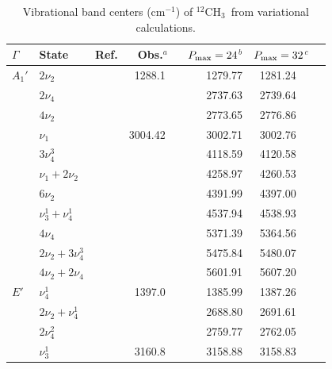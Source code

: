 \documentclass{achemso}
\newcommand{\3}{$_{3}$}
\newcommand{\cm}{cm$^{-1}$}
\newcommand{\onlinecite}[1]{\citenum{#1}}
\begin{document}
\begin{table}
\caption{\label{t:energies}  Vibrational band centers (\cm) of $^{12}$CH\3\ from variational calculations.}
\begin{center}
\tabcolsep=5pt
\renewcommand{\arraystretch}{1.175}
\begin{tabular}{llcr@{}lrrr@{}l}
\hline
\hline
$\Gamma$& State &  Ref. & \multicolumn{2}{c}{Obs.$^a$}   & \multicolumn{1}{c}{$P_{\rm max}=24$$^b$}  & \multicolumn{2}{c}{$P_{\rm max}=32$$^c$} &\\
\hline
$A_1'$  &       $       2\nu_2                  $       & \onlinecite{nu2_81} 	& 1288.1\phantom{00}    &       &       1279.77	&	1281.24	&	\\
        &       $       2\nu_4                  $	& 	                &		        &	&	2737.63	&	2739.64 &	\\
        &	$	4\nu_2	                $	& 	                &	 	        &	&	2773.65	&	2776.86	&	\\
        &	$	 \nu_1	                $	& \onlinecite{nu1_92}   & 3004.42\phantom{0}    &       &       3002.71 &       3002.76 &       \\
        &	$	3\nu_4^3	        $	& 	                &		        &	&	4118.59	&	4120.58	&	\\
        &	$	 \nu_1+2\nu_2	        $	&	                &		        &	&	4258.97	&	4260.53	&	\\
        &	$	6\nu_2	                $	&	                &		        &	&	4391.99	&	4397.00	&	\\
        &	$	 \nu_3^1+\nu_4^1	$	&	                &		        &	&	4537.94	&	4538.93	&	\\
        &       $	4\nu_4	                $	&	                &		        &	&	5371.39	&	5364.56	&	\\
        &       $	2\nu_2+3\nu_4^3	        $	&	                &		        &	&	5475.84	&	5480.07	&	\\
        &	$	4\nu_2+2\nu_4	        $	&	                &		        &	&	5601.91	&	5607.20	&	\\
$ E'$	&	$	 \nu_4^1	        $	& \onlinecite{nu4_94}	& 1397.0\phantom{00}	&	&	1385.99	&	1387.26	&	\\
        &	$	2\nu_2+\nu_4^1	        $	&	                &		        &	&	2688.80	&	2691.61	&	\\
        &	$	2\nu_4^2	        $	&	                &	 	        &	&	2759.77	&	2762.05	&	\\
        &	$	 \nu_3^1	        $	& \onlinecite{nu3_97b}	& 3160.8\phantom{00}	&	&	3158.88	&	3158.83	&	\\

\end{tabular}
\end{center}
\end{table}
\end{document}
